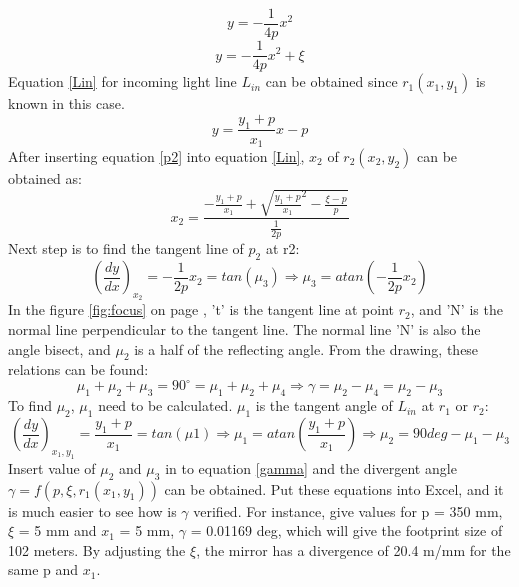 \begin{equation}
\label{p1}
y = -\frac{1}{4p}x^{2}
\end {equation}
\begin{equation}
\label{p2}
y = -\frac{1}{4p}x^{2}+\xi
\end {equation}
Equation \ref{Lin} for incoming light line $L_{in}$ can be obtained since $r_{1}(x_{1}, y_{1})$ is known in this case. 
\begin{equation}
\label{Lin}
y = \frac{y_{1}+p}{x_{1}}x-p
\end {equation}
After inserting equation \ref{p2} into equation \ref{Lin}, $x_{2}$ of $r_{2}(x_{2}, y_{2})$ can be obtained as:
\begin{equation}
\label{x2}
x_{2} = \frac{-\frac{y_{1}+p}{x_{1}}+\sqrt{{\frac{y_{1}+p}{x_{1}}}^2-\frac{\xi-p}{p}}}{\frac{1}{2p}}
\end {equation}
Next step is to find the tangent line of $p_{2}$ at r2:
\begin{equation}
\label{miu3}
(\frac{dy}{dx})_{x_{2}} = -\frac{1}{2p}x_{2} = tan(\mu_{3}) \Rightarrow \mu_{3} = atan(-\frac{1}{2p}x_{2})
\end {equation}
In the figure \ref{fig:focus} on page \pageref{fig:focus}, 't' is the tangent line at point $r_{2}$, and 'N' is the normal line perpendicular to the tangent line. The normal line 'N' is also the angle bisect, and $\mu_{2}$ is a half of the reflecting angle. From the drawing, these relations can be found:
\begin{equation}
\label{gamma}
\mu_{1}+\mu_{2}+\mu_{3} = 90^{\circ} = \mu_{1}+\mu_{2}+\mu_{4}
\Longrightarrow \gamma = \mu_{2} - \mu_{4} = \mu_{2} - \mu_{3} 
\end {equation}
To find $\mu_{2}$, $\mu_{1}$ need to be calculated. $\mu_{1}$ is the tangent angle of $L_{in}$ at $r_{1}$ or $r_{2}$:
\begin{equation}
\label{miu2}
(\frac{dy}{dx})_{x_{1},y_{1}} = \frac{y_{1}+p}{x_{1}} = tan(\mu{1})\Rightarrow \mu_{1} = atan(\frac{y_{1}+p}{x_{1}}) \Rightarrow \mu_{2} = 90deg - \mu_{1} - \mu_{3}
\end {equation}
Insert value of $\mu_{2}$ and $\mu_{3}$ in to equation \ref{gamma} and the divergent angle $\gamma = f(p, \xi, r_{1}(x_{1}, y_{1}))$ can be obtained. Put these equations into Excel, and it is much easier to see how is $\gamma$ verified. For instance, give values for p = 350 mm, $\xi$ = 5 mm and $x_{1}$ = 5 mm, $\gamma$ = 0.01169 deg, which will give the footprint size of 102 meters. By adjusting the $\xi$, the mirror has a divergence of 20.4 m/mm for the same p and $x_{1}$.

